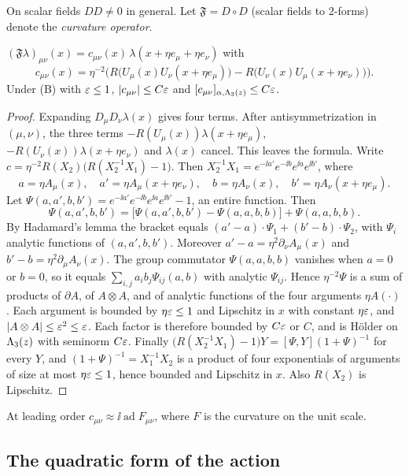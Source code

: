On scalar fields $DD\ne0$ in general. Let $\mathfrak F=D\circ D$ (scalar fields to $2$-forms) denote the \emph{curvature operator}.

\begin{lemma}\label{lem:curvature}
$(\mathfrak F\lambda)_{\mu\nu}(x)=c_{\mu\nu}(x)\,\lambda(x+\eta e_\mu+\eta e_\nu)$ with
\[
c_{\mu\nu}(x)=\eta^{-2}\Big(R\big(U_\mu(x)U_\nu(x+\eta e_\mu)\big)-R\big(U_\nu(x)U_\mu(x+\eta e_\nu)\big)\Big).
\]
Under (B) with $\varepsilon\le1$, $|c_{\mu\nu}|\le C\varepsilon$ and $[c_{\mu\nu}]_{\alpha,\Lambda_3(z)}\le C\varepsilon$.
\end{lemma}

\begin{proof}
Expanding $D_\mu D_\nu\lambda(x)$ gives four terms. After antisymmetrization in $(\mu,\nu)$, the three terms $-R(U_\mu(x))\lambda(x+\eta e_\mu)$, $-R(U_\nu(x))\lambda(x+\eta e_\nu)$ and $\lambda(x)$ cancel. This leaves the formula. Write $c=\eta^{-2}R(X_2)\big(R(X_2^{-1}X_1)-1\big)$. Then $X_2^{-1}X_1=e^{-\ii a'}e^{-\ii b}e^{\ii a}e^{\ii b'}$, where
\[
a=\eta A_\mu(x),\quad a'=\eta A_\mu(x+\eta e_\nu),\quad b=\eta A_\nu(x),\quad b'=\eta A_\nu(x+\eta e_\mu).
\]
Let $\Psi(a,a',b,b')=e^{-\ii a'}e^{-\ii b}e^{\ii a}e^{\ii b'}-1$, an entire function. Then
\[
\Psi(a,a',b,b')=\big[\Psi(a,a',b,b')-\Psi(a,a,b,b)\big]+\Psi(a,a,b,b).
\]
By Hadamard's lemma the bracket equals $(a'-a)\cdot\Psi_1+(b'-b)\cdot\Psi_2$, with $\Psi_i$ analytic functions of $(a,a',b,b')$. Moreover $a'-a=\eta^2\partial_\nu A_\mu(x)$ and $b'-b=\eta^2\partial_\mu A_\nu(x)$. The group commutator $\Psi(a,a,b,b)$ vanishes when $a=0$ or $b=0$, so it equals $\sum_{i,j}a_ib_j\Psi_{ij}(a,b)$ with analytic $\Psi_{ij}$. Hence $\eta^{-2}\Psi$ is a sum of products of $\partial A$, of $A\otimes A$, and of analytic functions of the four arguments $\eta A(\cdot)$. Each argument is bounded by $\eta\varepsilon\le1$ and Lipschitz in $x$ with constant $\eta\varepsilon$, and $|A\otimes A|\le\varepsilon^2\le\varepsilon$. Each factor is therefore bounded by $C\varepsilon$ or $C$, and is H\"older on $\Lambda_3(z)$ with seminorm $C\varepsilon$. Finally $\big(R(X_2^{-1}X_1)-1\big)Y=[\Psi,Y](1+\Psi)^{-1}$ for every $Y$, and $(1+\Psi)^{-1}=X_1^{-1}X_2$ is a product of four exponentials of arguments of size at most $\eta\varepsilon\le1$, hence bounded and Lipschitz in $x$. Also $R(X_2)$ is Lipschitz.
\end{proof}

At leading order $c_{\mu\nu}\approx\ii\operatorname{ad}F_{\mu\nu}$, where $F$ is the curvature on the unit scale.

\subsection{The quadratic form of the action}

